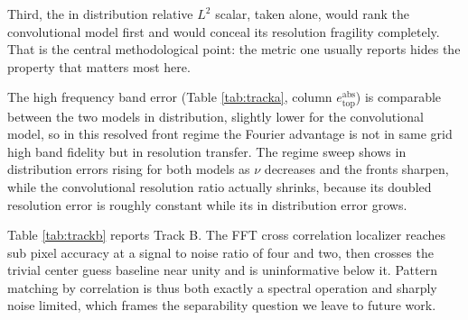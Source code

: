 \documentclass[conference]{IEEEtran}
\begin{document}
Third, the in distribution relative $L^2$ scalar, taken alone, would rank the convolutional model first and would conceal its resolution fragility completely. That is the central methodological point: the metric one usually reports hides the property that matters most here.

The high frequency band error (Table \ref{tab:tracka}, column $e^{\mathrm{abs}}_{\mathrm{top}}$) is comparable between the two models in distribution, slightly lower for the convolutional model, so in this resolved front regime the Fourier advantage is not in same grid high band fidelity but in resolution transfer. The regime sweep shows in distribution errors rising for both models as $\nu$ decreases and the fronts sharpen, while the convolutional resolution ratio actually shrinks, because its doubled resolution error is roughly constant while its in distribution error grows.

Table \ref{tab:trackb} reports Track B. The FFT cross correlation localizer reaches sub pixel accuracy at a signal to noise ratio of four and two, then crosses the trivial center guess baseline near unity and is uninformative below it. Pattern matching by correlation is thus both exactly a spectral operation and sharply noise limited, which frames the separability question we leave to future work.
\end{document}
